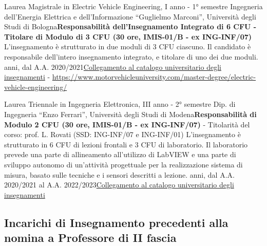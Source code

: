 {
{Laurea Magistrale in Electric Vehicle Engineering, I anno - 1° semestre}
{\newline  Ingegneria dell'Energia Elettrica e dell'Informazione ``Guglielmo Marconi'', Università degli Studi di Bologna}{\newline \textbf{Responsabilità dell'Insegnamento Integrato di 6 CFU - Titolare di Modulo di 3 CFU (30 ore, IMIS-01/B - ex ING-INF/07)}\newline
    L'insegnamento è strutturato in due moduli di 3 CFU ciascuno. Il candidato è responsabile dell'intero insegnamento integrato, e titolare di uno dei due moduli. anni, dal A.A. 2020/2021}{\href{https://www.unibo.it/en/study/course-units-transferable-skills-moocs/course-unit-catalogue?codiceMateria=93730&annoAccademico=2024&codiceCorso=5699&single=True&search=True}{Collegamento al catalogo universitario degli insegnamenti} - \href{https://www.motorvehicleuniversity.com/master-degree/electric-vehicle-engineering/}{https://www.motorvehicleuniversity.com/master-degree/electric-vehicle-engineering/}}


{Laurea Triennale in Ingegneria Elettronica, III anno - 2° semestre}
{\newline  Dip. di Ingegneria “Enzo Ferrari'', Università degli Studi di Modena}{\newline \textbf{Responsabilità di Modulo 2 CFU (30 ore, IMIS-01/B - ex ING-INF/07)} - Titolarità del corso: prof. L. Rovati (SSD: ING-INF/07 e ING-INF/01)\newline
    L'insegnamento è strutturato in 6 CFU di lezioni frontali e 3 CFU di laboratorio. Il laboratorio prevede una parte di allineamento all'utilizzo di LabVIEW e una parte di sviluppo autonomo di un'attività progettuale per la realizzazione sistema di misura, basato sulle tecniche e i sensori descritti a lezione. anni, dal A.A. 2020/2021 al A.A. 2022/2023}{\href{https://unimore.coursecatalogue.cineca.it/insegnamenti/2022/24151/2016/10000/10359?coorte=2020&schemaid=19254}{Collegamento al catalogo universitario degli insegnamenti}}

\subsection{Incarichi di Insegnamento precedenti alla nomina a Professore di II fascia}

}
